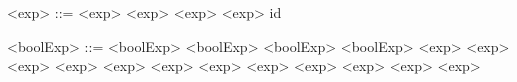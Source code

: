 \begin{grammarEx}
	<exp> ::= <exp> \lit{+} <exp>
	\alt <exp> \lit{*} <exp>
	\alt id

	<boolExp> ::= <boolExp> \lit{\&\&} <boolExp>
	\alt <boolExp> \lit{\textbar\textbar} <boolExp>
	\alt <exp> \lit{\textless} <exp>
	\alt <exp> \lit{\textgreater} <exp>
	\alt <exp> \lit{\textless{}=} <exp>
	\alt <exp> \lit{\textgreater{}=} <exp>
	\alt <exp> \lit{=} <exp>
	\alt <exp> \lit{\textless\textgreater} <exp>
	\alt {}
	\alt {}
\end{grammarEx}
